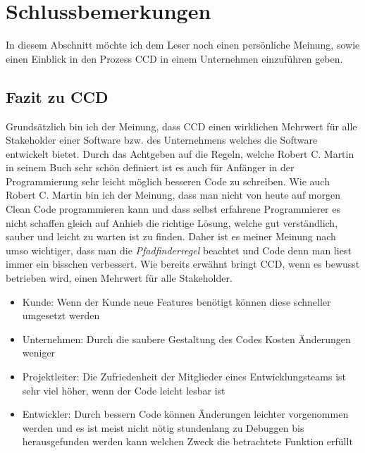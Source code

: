 \chapter{Schlussbemerkungen}
\label{cha:Schluss}
In diesem Abschnitt möchte ich dem Leser noch einen persönliche Meinung, sowie einen Einblick in den Prozess CCD in einem Unternehmen einzuführen geben.
\section{Fazit zu CCD}
 Grundsätzlich bin ich der Meinung, dass CCD einen wirklichen Mehrwert für alle Stakeholder einer Software bzw. des Unternehmens welches die Software entwickelt bietet. Durch das Achtgeben auf die Regeln, welche Robert C. Martin in seinem Buch sehr schön definiert ist es auch für Anfänger in der Programmierung sehr leicht möglich besseren Code zu schreiben. Wie auch Robert C. Martin bin ich der Meinung, dass man nicht von heute auf morgen Clean Code programmieren kann und dass selbst erfahrene Programmierer es nicht schaffen gleich auf Anhieb die richtige Lösung, welche gut verständlich, sauber und leicht zu warten ist zu finden. Daher ist es meiner Meinung nach umso wichtiger, dass man die \textit{Pfadfinderregel} beachtet und Code denn man liest immer ein bisschen verbessert. Wie bereits erwähnt bringt CCD, wenn es bewusst betrieben wird, einen Mehrwert für alle Stakeholder. 
\begin{itemize}
	\item Kunde: Wenn der Kunde neue Features benötigt können diese schneller umgesetzt werden
	\item Unternehmen: Durch die saubere Gestaltung des Codes Kosten Änderungen weniger
	\item Projektleiter: Die Zufriedenheit der Mitglieder eines Entwicklungsteams ist sehr viel höher, wenn der Code leicht lesbar ist
	\item Entwickler: Durch bessern Code können Änderungen leichter vorgenommen werden und es ist meist nicht nötig stundenlang zu Debuggen bis herausgefunden werden kann welchen Zweck die betrachtete Funktion erfüllt
\end{itemize}


